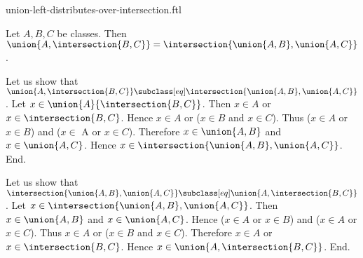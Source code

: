 \documentclass{article}
\begin{document}
\begin{smodule}[creators={Marcel Schütz}]{union-left-distributes-over-intersection.ftl}

  \begin{fproposition*}[label=5609225394847744]
    Let $A, B, C$ be classes.
    Then $\union{A,\intersection{B,C}} = \intersection{\union{A,B},\union{A,C}}$.
  \end{fproposition*}
  \begin{fproof}
    Let us show that $\union{A,\intersection{B,C}} \subclass[eq] \intersection{\union{A,B},\union{A,C}}$.
      Let $x \in \union{A}{\intersection{B,C}}$.
      Then $x \in A$ or $x \in \intersection{B,C}$.
      Hence $x \in A$ or ($x \in B$ and $x \in C$).
      Thus ($x \in A$ or $x \in B$) and ($x \in$ A or $x \in C$).
      Therefore $x \in \union{A,B}$ and $x \in \union{A,C}$.
      Hence $x \in \intersection{\union{A,B},\union{A,C}}$.
    End.

    Let us show that $\intersection{\union{A,B},\union{A,C}} \subclass[eq] \union{A,\intersection{B,C}}$.
      Let $x \in \intersection{\union{A,B},\union{A,C}}$.
      Then $x \in \union{A,B}$ and $x \in \union{A,C}$.
      Hence ($x \in A$ or $x \in B$) and ($x \in A$ or $x \in C$).
      Thus $x \in A$ or ($x \in B$ and $x \in C$).
      Therefore $x \in A$ or $x \in \intersection{B,C}$.
      Hence $x \in \union{A,\intersection{B,C}}$.
    End.
  \end{fproof}
\end{smodule}
\end{document}
